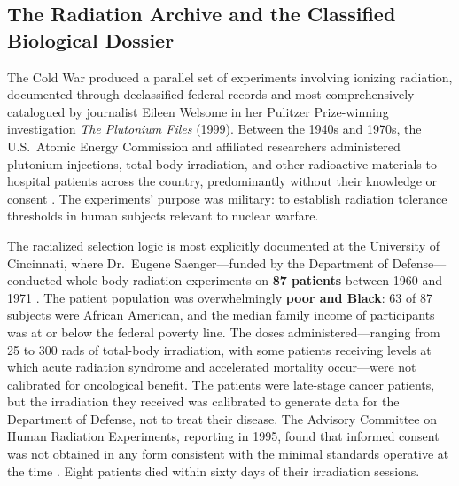 \subsection{The Radiation Archive and the Classified Biological Dossier}
\label{subsec:radiation_lyme}

The Cold War produced a parallel set of experiments involving ionizing radiation, documented through declassified federal records and most comprehensively catalogued by journalist Eileen Welsome in her Pulitzer Prize-winning investigation \textit{The Plutonium Files} (1999). Between the 1940s and 1970s, the U.S.\ Atomic Energy Commission and affiliated researchers administered plutonium injections, total-body irradiation, and other radioactive materials to hospital patients across the country, predominantly without their knowledge or consent \cite{welsome_plutonium, advisory_committee}. The experiments' purpose was military: to establish radiation tolerance thresholds in human subjects relevant to nuclear warfare.

The racialized selection logic is most explicitly documented at the University of Cincinnati, where Dr.\ Eugene Saenger---funded by the Department of Defense---conducted whole-body radiation experiments on \textbf{87 patients} between 1960 and 1971 \cite{advisory_committee}. The patient population was overwhelmingly \textbf{poor and Black}: 63 of 87 subjects were African American, and the median family income of participants was at or below the federal poverty line. The doses administered---ranging from 25 to 300 rads of total-body irradiation, with some patients receiving levels at which acute radiation syndrome and accelerated mortality occur---were not calibrated for oncological benefit. The patients were late-stage cancer patients, but the irradiation they received was calibrated to generate data for the Department of Defense, not to treat their disease. The Advisory Committee on Human Radiation Experiments, reporting in 1995, found that informed consent was not obtained in any form consistent with the minimal standards operative at the time \cite{advisory_committee}. Eight patients died within sixty days of their irradiation sessions.

